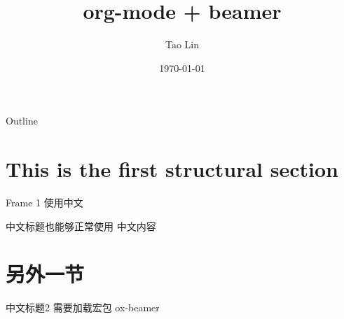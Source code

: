 \documentclass[presentation]{beamer}
\author{Tao Lin}
\date{\today}
\title{org-mode + beamer}
\begin{document}
\maketitle
\begin{frame}{Outline}
\tableofcontents
\end{frame}


\section{This is the first structural section}
\label{sec:orgf541463}

\begin{frame}[label={sec:org12cc6f1}]{Frame 1}
使用中文
\end{frame}

\begin{frame}[label={sec:orgb6aad0f}]{中文标题也能够正常使用}
中文内容
\end{frame}

\section{另外一节}
\label{sec:org9537cad}

\begin{frame}[label={sec:org5fcdeb1}]{中文标题2}
需要加载宏包 \alert{ox-beamer}
\end{frame}
\end{document}

